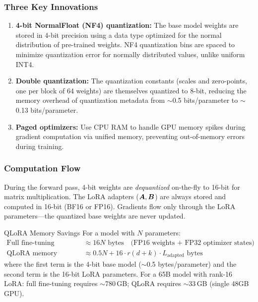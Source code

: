 \subsubsection{Three Key Innovations}

\begin{enumerate}
    \item \textbf{4-bit NormalFloat (NF4) quantization:} The base model
          weights are stored in 4-bit precision using a data type optimized
          for the normal distribution of pre-trained weights.  NF4 quantization
          bins are spaced to minimize quantization error for normally
          distributed values, unlike uniform INT4.

    \item \textbf{Double quantization:} The quantization constants (scales
          and zero-points, one per block of 64 weights) are themselves quantized
          to 8-bit, reducing the memory overhead of quantization metadata from
          $\sim$0.5 bits/parameter to $\sim$0.13 bits/parameter.

    \item \textbf{Paged optimizers:} Use CPU RAM to handle GPU memory spikes
          during gradient computation via unified memory, preventing
          out-of-memory errors during training.
\end{enumerate}

\subsubsection{Computation Flow}

During the forward pass, 4-bit weights are \emph{dequantized} on-the-fly to
16-bit for matrix multiplication.  The LoRA adapters ($\bm{A}, \bm{B}$) are always
stored and computed in 16-bit (BF16 or FP16).  Gradients flow only through the
LoRA parameters---the quantized base weights are never updated.

\begin{mathresult}{QLoRA Memory Savings}
For a model with $N$ parameters:
\begin{align*}
    \text{Full fine-tuning memory} &\approx 16N \text{ bytes}
    \quad \text{(FP16 weights + FP32 optimizer states)} \\[4pt]
    \text{QLoRA memory} &\approx 0.5N + 16 \cdot r(d+k) \cdot L_{\text{adapted}}
    \text{ bytes}
\end{align*}
where the first term is the 4-bit base model ($\sim$0.5 bytes/parameter) and
the second term is the 16-bit LoRA parameters.  For a 65B model with rank-16 LoRA:
full fine-tuning requires $\sim$780\,GB; QLoRA requires $\sim$33\,GB (single
48GB GPU).
\end{mathresult}

